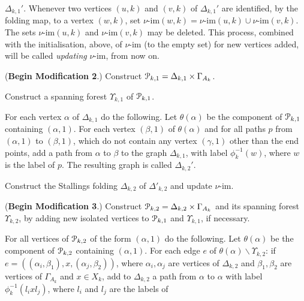 \documentclass[a4paper,12pt]{article}
\renewcommand{\a}{\alpha }
\renewcommand{\b}{\beta }
\newcommand{\G}{\Gamma }
\newcommand{\g}{\gamma }
\newcommand{\D}{\Delta }
\newcommand{\U}{\Upsilon }
\newcommand{\cP}{{\cal{P}}}
\newcommand{\vim}{\nu\textrm{-im}}
\numberwithin{equation}{section}
\numberwithin{figure}{section}
\newcommand{\bs}{\backslash}
\begin{document}
$\D_{k,1}'$.  
Whenever two vertices $(u,k)$ and $(v,k)$
of $\D_{k,1}'$ are identified, by the folding map, to a vertex $(w,k)$, 
set $\vim(w,k)=\vim(u,k)\cup \vim(v,k)$. 
The sets $\vim(u,k)$ and $\vim(v,k)$ may be deleted.  This process, combined 
with the initialisation, above, of $\vim$ (to the empty set) for new vertices
added,  will be
called \emph{updating}
$\vim$, from now on. 
\item\label{it:C4} (\textbf{Begin Modification 2}.)
 Construct $\cP_{k,1}=\D_{k,1}\times \G_{A_k}$.
\item\label{it:C5} Construct a spanning forest $\U_{k,1}$ of $\cP_{k,1}$.

\item\label{it:C6} For each vertex $\a$ of $\D_{k,1}$ do the following.
 Let
$\theta(\a)$ be the component of $\cP_{k,1}$ containing $(\a,1)$.
For each vertex $(\b,1)$ of $\theta(\a)$ and for all paths $p$ from
$(\a,1)$ to $(\b,1)$, which do not contain  any vertex $(\g,1)$ other than
the end points, 
 add a path from $\a$ to $\b$ to the graph $\D_{k,1}$, with
label $\phi_k^{-1}(w)$, where $w$ is the label of $p$.
The resulting graph is called $\D_{k,2}'$.
\item\label{it:C7} Construct the Stallings folding $\D_{k,2}$ of $\D'_{k,2}$ and update $\vim$.
\item\label{it:C8} (\textbf{Begin Modification 3}.)
 Construct $\cP_{k,2}=\D_{k,2}\times \G_{A_k}$ and its spanning
 forest $\U_{k,2}$, by adding new isolated vertices to $\cP_{k,1}$ and 
$\U_{k,1}$,
if necessary. 
\item\label{it:C9} For all vertices of $\cP_{k,2}$ of the 
form $(\a,1)$ do the following.
Let $\theta(\a)$ be the component of $\cP_{k,2}$ containing $(\a,1)$.
For each edge $e$ of $\theta(\a)\bs \U_{k,2}$: 
if $e=((\a_i,\b_1),x ,(\a_j,\b_2))$,
where $\a_i,\a_j$ are vertices of $\D_{k,2}$ and $\b_1,\b_2$ are vertices
of $\G_{A_k}$ and $x\in X_k$, add to $\D_{k,2}$ a path from $\a$ to $\a$ with
label $\phi_k^{-1}(l_ixl_j)$, where $l_i$ and $l_j$ are the labels of
\end{document}

